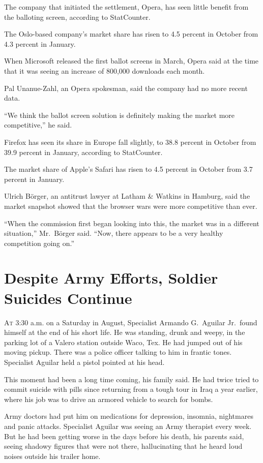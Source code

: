 ﻿\documentclass[12pt]{article}
\begin{document}
The company that initiated the settlement, Opera, has seen little benefit from the balloting screen,
according to StatCounter.

The Oslo-based company's market share has risen to 4.5 percent in October from 4.3 percent in
January.

When Microsoft released the first ballot screens in March, Opera said at the time that it was seeing
an increase of 800,000 downloads each month.

Pal Unanue-Zahl, an Opera spokesman, said the company had no more recent data.

``We think the ballot screen solution is definitely making the market more competitive,'' he said.

Firefox has seen its share in Europe fall slightly, to 38.8 percent in October from 39.9 percent in
January, according to StatCounter.

The market share of Apple's Safari has risen to 4.5 percent in October from 3.7 percent in January.

Ulrich Börger, an antitrust lawyer at Latham \& Watkins in Hamburg, said the market snapshot showed
that the browser wars were more competitive than ever.

``When the commission first began looking into this, the market was in a different situation,''
Mr.~Börger said. ``Now, there appears to be a very healthy competition going on.''

\section{Despite Army Efforts, Soldier Suicides Continue}

\lettrine{A}{t} 3:30 a.m. on a Saturday in August, Specialist Armando
G.~Aguilar Jr.~found himself at the end of his short life. He was standing, drunk and weepy, in the
parking lot of a Valero station outside Waco, Tex. He had jumped out of his moving pickup. There was
a police officer talking to him in frantic tones. Specialist Aguilar held a pistol pointed at his
head.

This moment had been a long time coming, his family said. He had twice tried to commit suicide with
pills since returning from a tough tour in Iraq a year earlier, where his job was to drive an
armored vehicle to search for bombs.

Army doctors had put him on medications for depression, insomnia, nightmares and panic attacks.
Specialist Aguilar was seeing an Army therapist every week. But he had been getting worse in the
days before his death, his parents said, seeing shadowy figures that were not there, hallucinating
that he heard loud noises outside his trailer home.
\end{document}
